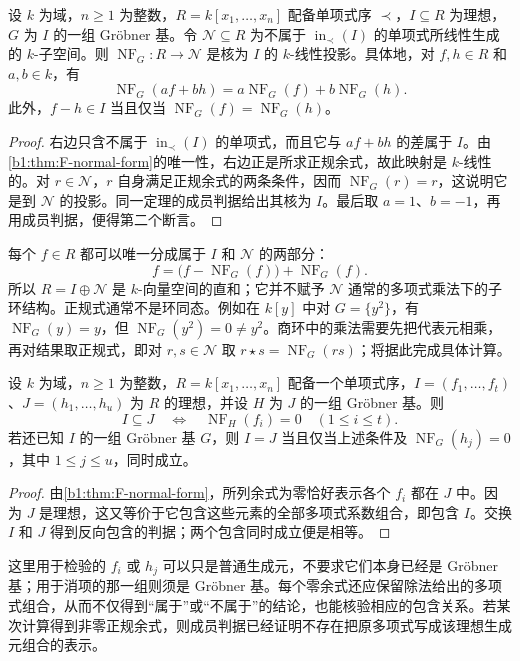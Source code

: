 \begin{proposition}\label{b1:prop:F-normal-form-linear}
	设 \(k\) 为域，\(n\geq1\) 为整数，\(R=k[x_1,\ldots,x_n]\) 配备单项式序 \(\prec\)，\(I\subseteq R\) 为理想，\(G\) 为 \(I\) 的一组 Gröbner 基。令 \(\mathcal N\subseteq R\) 为不属于 \(\operatorname{in}_{\prec}(I)\) 的单项式所线性生成的 \(k\)-子空间。则 \(\operatorname{NF}_G:R\longrightarrow\mathcal N\) 是核为 \(I\) 的 \(k\)-线性投影。具体地，对 \(f,h\in R\) 和 \(a,b\in k\)，有
	\[
		\operatorname{NF}_G(af+bh) =a\operatorname{NF}_G(f)+b\operatorname{NF}_G(h).
	\]
	此外，\(f-h\in I\) 当且仅当 \(\operatorname{NF}_G(f)=\operatorname{NF}_G(h)\)。
\end{proposition}
\begin{proof}
	右边只含不属于 \(\operatorname{in}_{\prec}(I)\) 的单项式，而且它与 \(af+bh\) 的差属于 \(I\)。由\cref{b1:thm:F-normal-form}的唯一性，右边正是所求正规余式，故此映射是 \(k\)-线性的。对 \(r\in\mathcal N\)，\(r\) 自身满足正规余式的两条条件，因而 \(\operatorname{NF}_G(r)=r\)，这说明它是到 \(\mathcal N\) 的投影。同一定理的成员判据给出其核为 \(I\)。最后取 \(a=1\)、\(b=-1\)，再用成员判据，便得第二个断言。
\end{proof}

每个 \(f\in R\) 都可以唯一分成属于 \(I\) 和 \(\mathcal N\) 的两部分：
\[
	f=\bigl(f-\operatorname{NF}_G(f)\bigr)+\operatorname{NF}_G(f).
\]
所以 \(R=I\oplus\mathcal N\) 是 \(k\)-向量空间的直和；它并不赋予 \(\mathcal N\) 通常的多项式乘法下的子环结构。正规式通常不是环同态。例如在 \(k[y]\) 中对 \(G=\{y^2\}\)，有 \(\operatorname{NF}_G(y)=y\)，但 \(\operatorname{NF}_G(y^2)=0\ne y^2\)。商环中的乘法需要先把代表元相乘，再对结果取正规式，即对 \(r,s\in\mathcal N\) 取 \(r\star s=\operatorname{NF}_G(rs)\)；将据此完成具体计算。

\begin{proposition}[理想包含与相等的判定]\label{b1:prop:F-ideal-comparison}
	设 \(k\) 为域，\(n\geq1\) 为整数，\(R=k[x_1,\ldots,x_n]\) 配备一个单项式序，\(I=(f_1,\ldots,f_t)\)、\(J=(h_1,\ldots,h_u)\) 为 \(R\) 的理想，并设 \(H\) 为 \(J\) 的一组 Gröbner 基。则
	\[
		I\subseteq J \quad\Longleftrightarrow\quad \operatorname{NF}_H(f_i)=0\quad(1\leq i\leq t).
	\]
	若还已知 \(I\) 的一组 Gröbner 基 \(G\)，则 \(I=J\) 当且仅当上述条件及 \(\operatorname{NF}_G(h_j)=0\)，其中 \(1\leq j\leq u\)，同时成立。
\end{proposition}
\begin{proof}
	由\cref{b1:thm:F-normal-form}，所列余式为零恰好表示各个 \(f_i\) 都在 \(J\) 中。因为 \(J\) 是理想，这又等价于它包含这些元素的全部多项式系数组合，即包含 \(I\)。交换 \(I\) 和 \(J\) 得到反向包含的判据；两个包含同时成立便是相等。
\end{proof}

这里用于检验的 \(f_i\) 或 \(h_j\) 可以只是普通生成元，不要求它们本身已经是 Gröbner 基；用于消项的那一组则须是 Gröbner 基。每个零余式还应保留除法给出的多项式组合，从而不仅得到“属于”或“不属于”的结论，也能核验相应的包含关系。若某次计算得到非零正规余式，则成员判据已经证明不存在把原多项式写成该理想生成元组合的表示。
